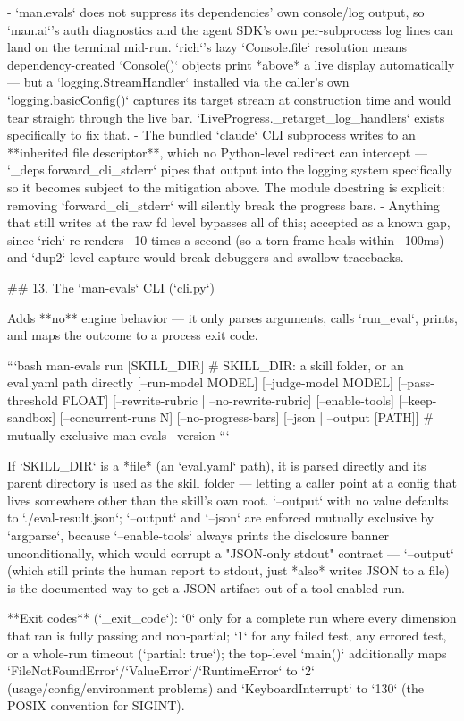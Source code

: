 - `man.evals` does not suppress its dependencies' own console/log output, so `man.ai`'s auth diagnostics and the agent SDK's own per-subprocess log lines can land on the terminal mid-run. `rich`'s lazy `Console.file` resolution means dependency-created `Console()` objects print *above* a live display automatically — but a `logging.StreamHandler` installed via the caller's own `logging.basicConfig()` captures its target stream at construction time and would tear straight through the live bar. `LiveProgress._retarget_log_handlers` exists specifically to fix that.
- The bundled `claude` CLI subprocess writes to an **inherited file descriptor**, which no Python-level redirect can intercept — `_deps.forward_cli_stderr` pipes that output into the logging system specifically so it becomes subject to the mitigation above. The module docstring is explicit: removing `forward_cli_stderr` will silently break the progress bars.
- Anything that still writes at the raw fd level bypasses all of this; accepted as a known gap, since `rich` re-renders ~10 times a second (so a torn frame heals within ~100ms) and `dup2`-level capture would break debuggers and swallow tracebacks.

## 13. The `man-evals` CLI (`cli.py`)

Adds **no** engine behavior — it only parses arguments, calls `run_eval`, prints, and maps the outcome to a process exit code.

```bash
man-evals run [SKILL_DIR]                 # SKILL_DIR: a skill folder, or an eval.yaml path directly
  [--run-model MODEL] [--judge-model MODEL]
  [--pass-threshold FLOAT]
  [--rewrite-rubric | --no-rewrite-rubric]
  [--enable-tools] [--keep-sandbox]
  [--concurrent-runs N]
  [--no-progress-bars]
  [--json | --output [PATH]]              # mutually exclusive
man-evals --version
```

If `SKILL_DIR` is a *file* (an `eval.yaml` path), it is parsed directly and its parent directory is used as the skill folder — letting a caller point at a config that lives somewhere other than the skill's own root. `--output` with no value defaults to `./eval-result.json`; `--output` and `--json` are enforced mutually exclusive by `argparse`, because `--enable-tools` always prints the disclosure banner unconditionally, which would corrupt a "JSON-only stdout" contract — `--output` (which still prints the human report to stdout, just *also* writes JSON to a file) is the documented way to get a JSON artifact out of a tool-enabled run.

**Exit codes** (`_exit_code`): `0` only for a complete run where every dimension that ran is fully passing and non-partial; `1` for any failed test, any errored test, or a whole-run timeout (`partial: true`); the top-level `main()` additionally maps `FileNotFoundError`/`ValueError`/`RuntimeError` to `2` (usage/config/environment problems) and `KeyboardInterrupt` to `130` (the POSIX convention for SIGINT).

